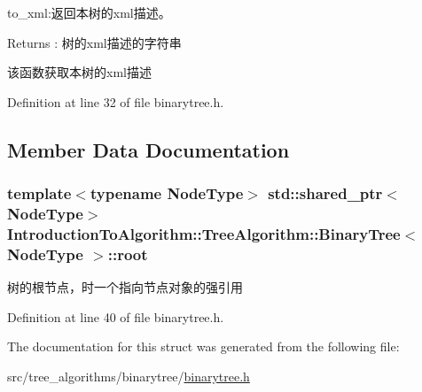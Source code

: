 to\+\_\+xml\+:返回本树的{\ttfamily xml}描述。 

\begin{DoxyReturn}{Returns}
\+: 树的{\ttfamily xml}描述的字符串
\end{DoxyReturn}
该函数获取本树的{\ttfamily xml}描述 

Definition at line 32 of file binarytree.\+h.



\subsection{Member Data Documentation}
\hypertarget{struct_introduction_to_algorithm_1_1_tree_algorithm_1_1_binary_tree_a81c2f14ccd7e44e3bb305c66cef417bd}{}
\subsubsection[{root}]{\setlength{\rightskip}{0pt plus 5cm}template$<$typename Node\+Type$>$ std\+::shared\+\_\+ptr$<$Node\+Type$>$ {\bf Introduction\+To\+Algorithm\+::\+Tree\+Algorithm\+::\+Binary\+Tree}$<$ Node\+Type $>$\+::root}\label{struct_introduction_to_algorithm_1_1_tree_algorithm_1_1_binary_tree_a81c2f14ccd7e44e3bb305c66cef417bd}
树的根节点，时一个指向节点对象的强引用 

Definition at line 40 of file binarytree.\+h.



The documentation for this struct was generated from the following file\+:\begin{DoxyCompactItemize}
\item 
src/tree\+\_\+algorithms/binarytree/\hyperlink{binarytree_8h}{binarytree.\+h}\end{DoxyCompactItemize}
